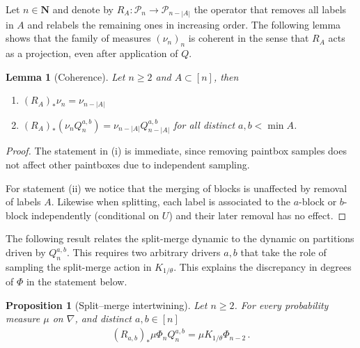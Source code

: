 \documentclass[a4paper,11pt]{article}
\newcommand{\NN}{\mathbf{N}}
\newcommand{\mP}{\mathcal{P}}
\numberwithin{equation}{section}
\newtheorem{lemma}[theorem]{Lemma}
\newtheorem{proposition}[theorem]{Proposition}
\begin{document}
Let $ n \in \NN$ and denote by  $ R_{A}: \mP_{n} \to \mP_{n- |A|}$ the operator that removes all labels in $ A $ and relabels the remaining ones in increasing order.
The following lemma shows that the family of measures $ (\nu_{n})_{n}$ is coherent in the sense that $ R_{A}$ acts as a projection, even after application of $ Q $.
\begin{lemma}[Coherence]\label{lem_coherence}
	Let $ n \geqslant 2$ and $ A \subset  [n]$, then 
	\begin{enumerate}
	\item[(i)] $ ( R_{A})_{\ast} \nu_{n}=\nu_{n- |A| } $
	\item[(ii)] $ ( R_{A})_{\ast} (\nu_{n} Q^{a,b}_{n})=\nu_{n -|A| }Q^{a,b}_{n-|A|}$ for all distinct $ a,b < \min  A $.
	\end{enumerate}
\end{lemma}

\begin{proof}
The statement in (i) is immediate, since removing paintbox samples does not affect other paintboxes due to independent sampling. 

For statement (ii) we notice that  the merging of blocks is unaffected by removal of labels $ A$. Likewise when splitting, each label is associated to the $ a$-block or $ b$-block independently (conditional on $U$) and their later removal  has no effect.
\end{proof}


The following result relates the split-merge dynamic to the dynamic on partitions driven by $ Q_{n}^{a,b}$. This requires two arbitrary drivers $ a,b $ that take the role of sampling the split-merge action in $ K_{1/ \theta}$. This explains the discrepancy in degrees of $\Phi$ in the statement below.

\begin{proposition}[Split--merge intertwining]\label{prop_intertwining}
	Let $ n \geqslant 2$.
For every probability measure $ \mu$ on $ \nabla $, and distinct $ a,b \in [n]$
\begin{equation*}
\begin{aligned}
	(R_{a,b})_{\ast}
\mu \Phi_{n} Q_{n}^{a,b} = \mu K_{1/\theta}\Phi_{n-2}\,.
\end{aligned}
\end{equation*}
\end{proposition}
\end{document}
